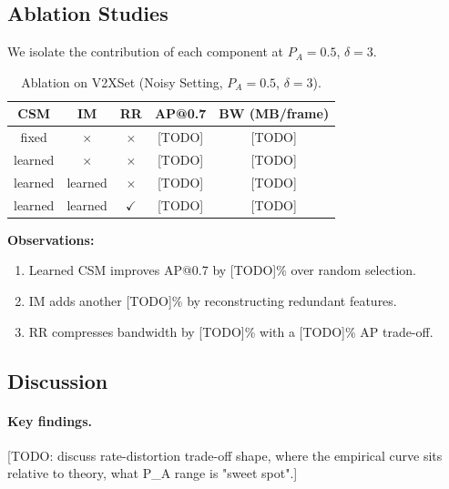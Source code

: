 \subsection{Ablation Studies}
\label{sec:exp-ablation}

We isolate the contribution of each component at $P_A = 0.5$, $\delta = 3$.

\begin{table}[htbp]
\centering
\caption{Ablation on V2XSet (Noisy Setting, $P_A = 0.5$, $\delta = 3$).}
\label{tab:ablation}
\begin{tabular}{|c|c|c|c|c|}
\hline
\textbf{CSM} & \textbf{IM} & \textbf{RR} & \textbf{AP@0.7} & \textbf{BW (MB/frame)} \\
\hline
fixed & $\times$ & $\times$ & [TODO] & [TODO] \\
learned & $\times$ & $\times$ & [TODO] & [TODO] \\
learned & learned & $\times$ & [TODO] & [TODO] \\
learned & learned & $\checkmark$ & [TODO] & [TODO] \\
\hline
\end{tabular}
\end{table}

\textbf{Observations:}
\begin{enumerate}
    \item Learned CSM improves AP@0.7 by [TODO]\% over random selection.
    \item IM adds another [TODO]\% by reconstructing redundant features.
    \item RR compresses bandwidth by [TODO]\% with a [TODO]\% AP trade-off.
\end{enumerate}

\subsection{Discussion}
\label{sec:exp-disc}

\paragraph{Key findings.}
[TODO: discuss rate-distortion trade-off shape, where the empirical curve
sits relative to theory, what P_A range is "sweet spot".]

